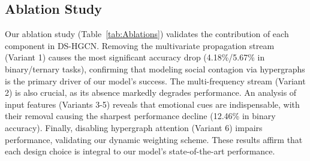 \documentclass[runningheads]{llncs}
\begin{document}
\begin{table}[t]
	\caption{Ablation studies of DS-HGCN. We compare our method with a collection of variants described in Sec.\ref{Ablations}}
	\centering
	\label{tab:Ablations}
\end{table}

\subsection{Ablation Study}{\label{Ablations}}

Our ablation study (Table~\ref{tab:Ablations}) validates the contribution of each component in DS-HGCN. Removing the multivariate propagation stream (Variant 1) causes the most significant accuracy drop (4.18\%/5.67\% in binary/ternary tasks), confirming that modeling social contagion via hypergraphs is the primary driver of our model's success. The multi-frequency stream (Variant 2) is also crucial, as its absence markedly degrades performance. An analysis of input features (Variants 3-5) reveals that emotional cues are indispensable, with their removal causing the sharpest performance decline (12.46\% in binary accuracy). Finally, disabling hypergraph attention (Variant 6) impairs performance, validating our dynamic weighting scheme. These results affirm that each design choice is integral to our model's state-of-the-art performance.
\end{document}
